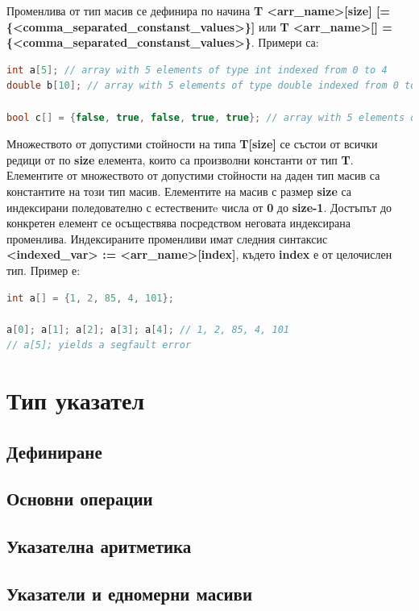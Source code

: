 \documentclass[fleqn,12pt]{article}
\begin{document}
Променлива от тип масив се дефинира по начина \textbf{T <arr\_name>[size] [= \{<comma\_separated\_constanst\_values>\}]} или \textbf{T <arr\_name>[] = \{<comma\_separated\_constanst\_values>\}}.
Примери са:

\begin{lstlisting}[language=C++, caption=Example array definitions]
int a[5]; // array with 5 elements of type int indexed from 0 to 4
double b[10]; // array with 5 elements of type double indexed from 0 to 9

bool c[] = {false, true, false, true, true}; // array with 5 elements of type bool
\end{lstlisting}

Множеството от допустими стойности на типа \textbf{T[size]} се състои от всички редици от по \textbf{size} елемента, които са произволни константи от тип \textbf{T}.
Елементите от множеството от допустими стойности на даден тип масив са константите на този тип масив.
\bigbreak
Елементите на масив с размер \textbf{size} са индексирани поледователно с естественитe числа от \textbf{0} до \textbf{size-1}.
Достъпът до конкретен елемент се осъществява посредством неговата индексирана променлива.
Индексираните променливи имат следния синтаксис \textbf{<indexed\_var> := <arr\_name>[index]}, където \textbf{index} е от целочислен тип.
Пример е:

\begin{lstlisting}[language=C++, caption=Example array item access]
int a[] = {1, 2, 85, 4, 101};

a[0]; a[1]; a[2]; a[3]; a[4]; // 1, 2, 85, 4, 101
// a[5]; yields a segfault error
\end{lstlisting}

\section{Тип указател}
\subsection{Дефиниране}
\subsection{Основни операции}
\subsection{Указателна аритметика}
\subsection{Указатели и едномерни масиви}
\end{document}
